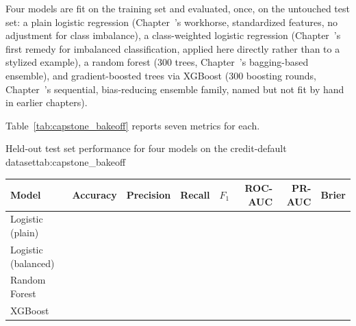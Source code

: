 \documentclass[../ai_in_finance]{subfiles}
\begin{document}
Four models are fit on the training set and evaluated, once, on the untouched test set: a plain logistic regression (Chapter~'s workhorse, standardized features, no adjustment for class imbalance), a class-weighted logistic regression (Chapter~'s first remedy for imbalanced classification, applied here directly rather than to a stylized example), a random forest (300 trees, Chapter~'s bagging-based ensemble), and gradient-boosted trees via XGBoost (300 boosting rounds, Chapter~'s sequential, bias-reducing ensemble family, named but not fit by hand in earlier chapters).

Table~\ref{tab:capstone_bakeoff} reports seven metrics for each.

\begin{booktable}[htbp]{Held-out test set performance for four models on the credit-default dataset}{tab:capstone_bakeoff}
\begin{tabular}{lrrrrrrr}
\toprule
Model & Accuracy & Precision & Recall & $F_1$ & ROC-AUC & PR-AUC & Brier \\
\midrule
Logistic (plain) & \vChTwentyOneBakeLRPlainAcc{} & \vChTwentyOneBakeLRPlainPrec{} & \vChTwentyOneBakeLRPlainRec{} & \vChTwentyOneBakeLRPlainFone{} & \vChTwentyOneBakeLRPlainROCAUC{} & \vChTwentyOneBakeLRPlainPRAUC{} & \vChTwentyOneBakeLRPlainBrier{} \\
Logistic (balanced) & \vChTwentyOneBakeLRBalAcc{} & \vChTwentyOneBakeLRBalPrec{} & \vChTwentyOneBakeLRBalRec{} & \vChTwentyOneBakeLRBalFone{} & \vChTwentyOneBakeLRBalROCAUC{} & \vChTwentyOneBakeLRBalPRAUC{} & \vChTwentyOneBakeLRBalBrier{} \\
Random Forest & \vChTwentyOneBakeRFAcc{} & \vChTwentyOneBakeRFPrec{} & \vChTwentyOneBakeRFRec{} & \vChTwentyOneBakeRFFone{} & \vChTwentyOneBakeRFROCAUC{} & \vChTwentyOneBakeRFPRAUC{} & \vChTwentyOneBakeRFBrier{} \\
XGBoost & \vChTwentyOneBakeXGBAcc{} & \vChTwentyOneBakeXGBPrec{} & \vChTwentyOneBakeXGBRec{} & \vChTwentyOneBakeXGBFone{} & \vChTwentyOneBakeXGBROCAUC{} & \vChTwentyOneBakeXGBPRAUC{} & \vChTwentyOneBakeXGBBrier{} \\
\bottomrule
\end{tabular}
\end{booktable}
\end{document}
